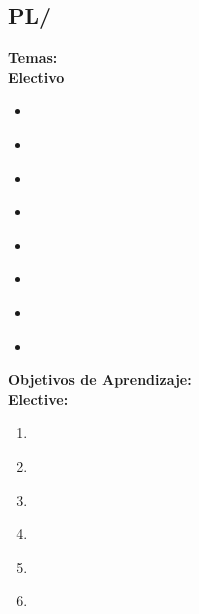 \subsection{PL/\PLStaticAnalysis}\label{sec:BOK:PLStaticAnalysis}
\noindent \textbf{Temas:}\\
\noindent \textbf{Electivo}
\begin{itemize}
	\item \PLStaticAnalysisTopicRelevant\label{sec:BOK:PLStaticAnalysisTopicRelevant}
	\item \PLStaticAnalysisTopicUndecidability\label{sec:BOK:PLStaticAnalysisTopicUndecidability}
	\item \PLStaticAnalysisTopicFlow\label{sec:BOK:PLStaticAnalysisTopicFlow}
	\item \PLStaticAnalysisTopicFlowSensitive\label{sec:BOK:PLStaticAnalysisTopicFlowSensitive}
	\item \PLStaticAnalysisTopicPath\label{sec:BOK:PLStaticAnalysisTopicPath}
	\item \PLStaticAnalysisTopicTools\label{sec:BOK:PLStaticAnalysisTopicTools}
	\item \PLStaticAnalysisTopicRole\label{sec:BOK:PLStaticAnalysisTopicRole}
	\item \PLStaticAnalysisTopicRoleOf\label{sec:BOK:PLStaticAnalysisTopicRoleOf}
\end{itemize}


\noindent \textbf{Objetivos de Aprendizaje:}\\
\noindent \textbf{Elective:}
\begin{enumerate}
	\setcounter{enumi}{0}
	\item \PLStaticAnalysisLODefineUseful\xspace[\PLStaticAnalysisLODefineUsefulLevel]\label{sec:BOK:PLStaticAnalysisLODefineUseful}
	\item \PLStaticAnalysisLOExplainWhySound\xspace[\PLStaticAnalysisLOExplainWhySoundLevel]\label{sec:BOK:PLStaticAnalysisLOExplainWhySound}
	\item \PLStaticAnalysisLOCommunicate\xspace[\PLStaticAnalysisLOCommunicateLevel]\label{sec:BOK:PLStaticAnalysisLOCommunicate}
	\item \PLStaticAnalysisLODistinguishMay\xspace[\PLStaticAnalysisLODistinguishMayLevel]\label{sec:BOK:PLStaticAnalysisLODistinguishMay}
	\item \PLStaticAnalysisLOExplainWhyLimits\xspace[\PLStaticAnalysisLOExplainWhyLimitsLevel]\label{sec:BOK:PLStaticAnalysisLOExplainWhyLimits}
	\item \PLStaticAnalysisLOUseTheA\xspace[\PLStaticAnalysisLOUseTheALevel]\label{sec:BOK:PLStaticAnalysisLOUseTheA}
\end{enumerate}


